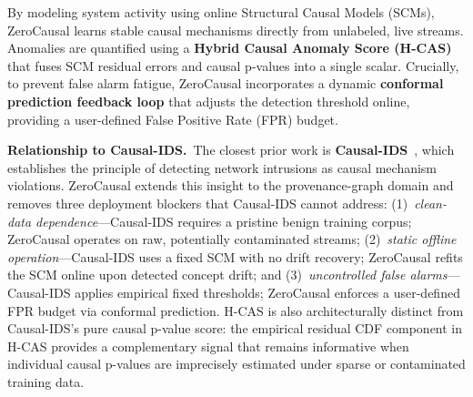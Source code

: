 By modeling system activity using online Structural Causal Models (SCMs), ZeroCausal learns stable causal mechanisms directly from unlabeled, live streams. Anomalies are quantified using a \textbf{Hybrid Causal Anomaly Score (H-CAS)} that fuses SCM residual errors and causal p-values into a single scalar. Crucially, to prevent false alarm fatigue, ZeroCausal incorporates a dynamic \textbf{conformal prediction feedback loop} that adjusts the detection threshold online, providing a user-defined False Positive Rate (FPR) budget.

\textbf{Relationship to Causal-IDS.}~The closest prior work is \textbf{Causal-IDS}~\cite{causalids2026}, which establishes the principle of detecting network intrusions as causal mechanism violations. ZeroCausal extends this insight to the provenance-graph domain and removes three deployment blockers that Causal-IDS cannot address: (1)~\emph{clean-data dependence}---Causal-IDS requires a pristine benign training corpus; ZeroCausal operates on raw, potentially contaminated streams; (2)~\emph{static offline operation}---Causal-IDS uses a fixed SCM with no drift recovery; ZeroCausal refits the SCM online upon detected concept drift; and (3)~\emph{uncontrolled false alarms}---Causal-IDS applies empirical fixed thresholds; ZeroCausal enforces a user-defined FPR budget via conformal prediction. H-CAS is also architecturally distinct from Causal-IDS's pure causal p-value score: the empirical residual CDF component in H-CAS provides a complementary signal that remains informative when individual causal p-values are imprecisely estimated under sparse or contaminated training data.

